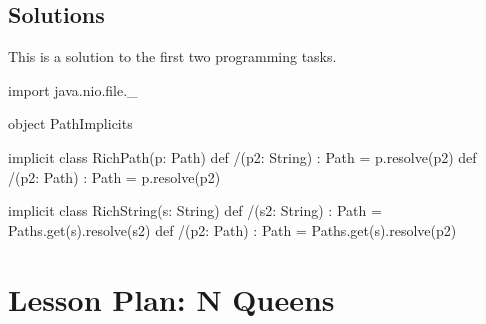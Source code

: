 \documentclass[9pt]{extbook}
\begin{document}
\section{Solutions}

This is a solution to the first two programming tasks.

\begin{scalacode}
  import java.nio.file._

  object PathImplicits {  
    implicit class RichPath(p: Path) {
      def /(p2: String) : Path = p.resolve(p2)
      def /(p2: Path) : Path = p.resolve(p2)
    }

    implicit class RichString(s: String) {
      def /(s2: String) : Path = Paths.get(s).resolve(s2)
      def /(p2: Path) : Path = Paths.get(s).resolve(p2)
    }
  }
\end{scalacode}

\chapter{Lesson Plan: N Queens}
\end{document}
